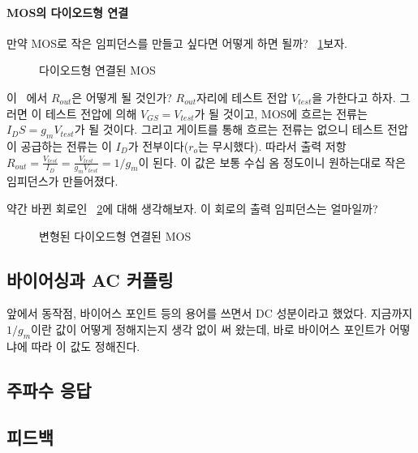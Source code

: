 \paragraph{MOS의 다이오드형 연결}
만약 MOS로 작은 임피던스를 만들고 싶다면 어떻게 하면 될까? \figurename~\ref{fig:diode connected}\를 보자.
\begin{figure}[!tbp]
    \centering
    \caption{다이오드형 연결된 MOS}\label{fig:diode connected}
\end{figure}
이 \figurename~에서 $R_{out}$은 어떻게 될 것인가? $R_{out}$자리에 테스트 전압 $V_{test}$을 가한다고 하자. 그러면 이 테스트 전압에 의해 $V_{GS}=V_{test}$가 될 것이고, MOS에 흐르는 전류는 $I_DS=g_mV_{test}$가 될 것이다.
그리고 게이트를 통해 흐르는 전류는 없으니 테스트 전압이 공급하는 전류는 이 $I_D$가 전부이다($r_o$는 무시했다). 따라서 출력 저항 $R_{out}=\frac{V_{test}}{I_D}=\frac{V_{test}}{g_mV_{test}}=1/g_m$이 된다. 이 값은 보통 수십 옴 정도이니 원하는대로 작은 임피던스가 만들어졌다.

약간 바뀐 회로인 \figurename~\ref{fig:diode connected with RD}에 대해 생각해보자. 이 회로의 출력 임피던스는 얼마일까?
\begin{figure}[!hbp]
    \centering
    \caption{변형된 다이오드형 연결된 MOS}\label{fig:diode connected with RD}
\end{figure}

\subsection{바이어싱과 AC 커플링}
앞에서 동작점, 바이어스 포인트 등의 용어를 쓰면서 DC 성분이라고 했었다. 지금까지 $1/g_m$이란 값이 어떻게 정해지는지 생각 없이 써 왔는데, 바로 바이어스 포인트가 어떻냐에 따라 이 값도 정해진다.

\subsection{주파수 응답}

\subsection{피드백}